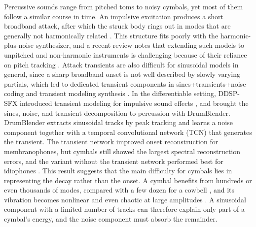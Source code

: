 Percussive sounds range from pitched toms to noisy cymbals, yet most of them follow a similar course in time.
An impulsive excitation produces a short broadband attack, after which the struck body rings out in modes that are generally not harmonically related \citep{fletcher1998physics}.
This structure fits poorly with the harmonic-plus-noise synthesizer, and a recent review notes that extending such models to unpitched and non-harmonic instruments is challenging because of their reliance on pitch tracking \citep{hayes2024review}.
Attack transients are also difficult for sinusoidal models in general, since a sharp broadband onset is not well described by slowly varying partials, which led to dedicated transient components in sines+transients+noise coding and transient modeling synthesis \citep{levine1998sines,verma2000extending}.
In the differentiable setting, DDSP-SFX introduced transient modeling for impulsive sound effects \citep{liu2024ddspsfx}, and \citet{shier2023differentiable} brought the sines, noise, and transient decomposition to percussion with DrumBlender.
DrumBlender extracts sinusoidal tracks by peak tracking and learns a noise component together with a temporal convolutional network (TCN) that generates the transient.
The transient network improved onset reconstruction for membranophones, but cymbals still showed the largest spectral reconstruction errors, and the variant without the transient network performed best for idiophones \citep{shier2023differentiable}.
This result suggests that the main difficulty for cymbals lies in representing the decay rather than the onset.
A cymbal benefits from hundreds or even thousands of modes, compared with a few dozen for a cowbell \citep{skare2019realtime}, and its vibration becomes nonlinear and even chaotic at large amplitudes \citep{chaigne2005nonlinear,bilbao2010percussion}.
A sinusoidal component with a limited number of tracks can therefore explain only part of a cymbal's energy, and the noise component must absorb the remainder.

